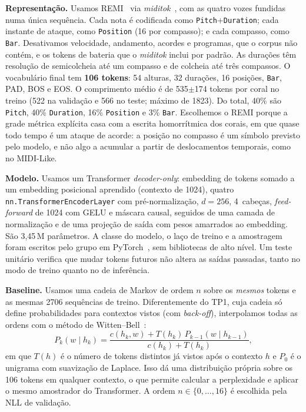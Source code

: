 \documentclass{article}
\begin{document}
\textbf{Representação.} Usamos REMI~\cite{huang2020remi} via \textit{miditok}~\cite{fradet2021miditok}, com as quatro vozes fundidas numa única sequência. Cada nota é codificada como \texttt{Pitch}+\texttt{Duration}; cada instante de ataque, como \texttt{Position} (16 por compasso); e cada compasso, como \texttt{Bar}. Desativamos velocidade, andamento, acordes e programas, que o corpus não contém, e os tokens de bateria que o \textit{miditok} inclui por padrão. As durações têm resolução de semicolcheia até um compasso e de colcheia até três compassos. O vocabulário final tem \textbf{106 tokens}: 54 alturas, 32 durações, 16 posições, \texttt{Bar}, PAD, BOS e EOS. O comprimento médio é de 535$\pm$174 tokens por coral no treino (522 na validação e 566 no teste; máximo de 1823). Do total, 40\% são \texttt{Pitch}, 40\% \texttt{Duration}, 16\% \texttt{Position} e 3\% \texttt{Bar}. Escolhemos o REMI porque a grade métrica explícita casa com a escrita homorrítmica dos corais, em que quase todo tempo é um ataque de acorde: a posição no compasso é um símbolo previsto pelo modelo, e não algo a acumular a partir de deslocamentos temporais, como no MIDI-Like.

\textbf{Modelo.} Usamos um Transformer \textit{decoder-only}: embedding de tokens somado a um embedding posicional aprendido (contexto de 1024), quatro \texttt{nn.TransformerEncoderLayer} com pré-normalização, $d=256$, 4~cabeças, \textit{feed-forward} de 1024 com GELU e máscara causal, seguidos de uma camada de normalização e de uma projeção de saída com pesos amarrados ao embedding. São 3{,}45\,M parâmetros. A classe do modelo, o laço de treino e a amostragem foram escritos pelo grupo em PyTorch~\cite{paszke2019}, sem bibliotecas de alto nível. Um teste unitário verifica que mudar tokens futuros não altera as saídas passadas, tanto no modo de treino quanto no de inferência.

\textbf{Baseline.} Usamos uma cadeia de Markov de ordem $n$ sobre os \emph{mesmos} tokens e as mesmas 2706 sequências de treino. Diferentemente do TP1, cuja cadeia só define probabilidades para contextos vistos (com \textit{back-off}), interpolamos todas as ordens com o método de Witten--Bell~\cite{witten1991}:
\begin{equation}
P_k(w\mid h_k)=\frac{c(h_k,w)+T(h_k)\,P_{k-1}(w\mid h_{k-1})}{c(h_k)+T(h_k)},
\end{equation}
em que $T(h)$ é o número de tokens distintos já vistos após o contexto $h$ e $P_0$ é o unigrama com suavização de Laplace. Isso dá uma distribuição própria sobre os 106 tokens em qualquer contexto, o que permite calcular a perplexidade e aplicar o mesmo amostrador do Transformer. A ordem $n\in\{0,\dots,16\}$ é escolhida pela NLL de validação.
\end{document}
